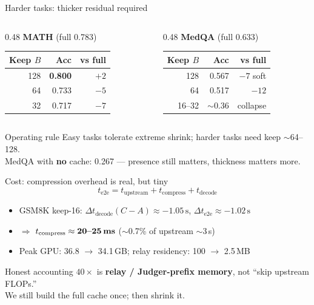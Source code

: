 \documentclass[aspectratio=169]{beamer}
\begin{document}
\begin{frame}{Harder tasks: thicker residual required}
\begin{columns}[T]
\begin{column}{0.48\textwidth}
\textbf{MATH} (full 0.783)
\begin{center}\small
\begin{tabular}{rrr}
\toprule
Keep $B$ & Acc & vs full \\
\midrule
128 & \textbf{0.800} & $+2$ \\
64 & 0.733 & $-5$ \\
32 & 0.717 & $-7$ \\
\bottomrule
\end{tabular}
\end{center}
\end{column}
\begin{column}{0.48\textwidth}
\textbf{MedQA} (full 0.633)
\begin{center}\small
\begin{tabular}{rrr}
\toprule
Keep $B$ & Acc & vs full \\
\midrule
128 & 0.567 & $-7$ soft \\
64 & 0.517 & $-12$ \\
16--32 & $\sim$0.36 & collapse \\
\bottomrule
\end{tabular}
\end{center}
\end{column}
\end{columns}
\vspace{0.5em}
\begin{block}{Operating rule}
Easy tasks tolerate extreme shrink; harder tasks need keep $\sim$64--128.\\
MedQA with \textbf{no} cache: 0.267 --- presence still matters, thickness matters more.
\end{block}
\end{frame}

\begin{frame}{Cost: compression overhead is real, but tiny}
\[
t_{\mathrm{e2e}} = t_{\mathrm{upstream}} + t_{\mathrm{compress}} + t_{\mathrm{decode}}
\]
\begin{itemize}
  \item GSM8K keep-16: $\Delta t_{\mathrm{decode}}(C{-}A)\approx -1.05\,\mathrm{s}$,
        $\Delta t_{\mathrm{e2e}}\approx -1.02\,\mathrm{s}$
  \item $\Rightarrow$ $t_{\mathrm{compress}}\approx \textbf{20--25\,ms}$ ($\sim$0.7\% of upstream $\sim$3\,s)
  \item Peak GPU: 36.8 $\to$ 34.1\,GB; relay residency: 100 $\to$ 2.5\,MB
\end{itemize}
\begin{alertblock}{Honest accounting}
$40\times$ is \textbf{relay / Judger-prefix memory}, not ``skip upstream FLOPs.''\\
We still build the full cache once; then shrink it.
\end{alertblock}
\end{frame}
\end{document}
